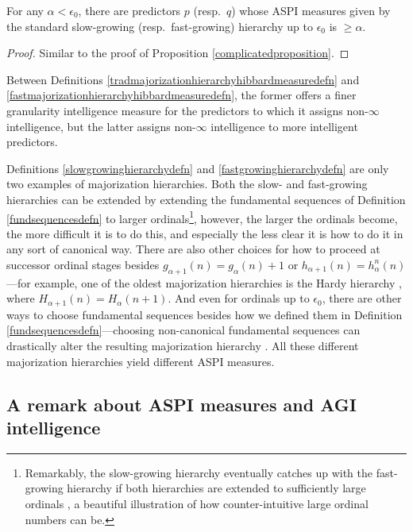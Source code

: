 \documentclass[twoside,11pt]{article}
\begin{document}
\begin{proposition}
    For any $\alpha<\epsilon_0$, there are predictors $p$ (resp.\ $q$)
    whose ASPI measures
    given by the standard slow-growing (resp.\ fast-growing)
    hierarchy up to $\epsilon_0$
    is $\geq \alpha$.
\end{proposition}

\begin{proof}
    Similar to the proof of Proposition \ref{complicatedproposition}.
\end{proof}

Between Definitions \ref{tradmajorizationhierarchyhibbardmeasuredefn} and
\ref{fastmajorizationhierarchyhibbardmeasuredefn}, the former offers a finer
granularity
intelligence measure for the predictors to which it assigns non-$\infty$
intelligence, but the latter assigns non-$\infty$ intelligence to
more intelligent predictors.

Definitions \ref{slowgrowinghierarchydefn}
and \ref{fastgrowinghierarchydefn} are only two
examples of
majorization hierarchies. Both the slow- and fast-growing hierarchies can be
extended by extending the fundamental sequences of Definition
\ref{fundsequencesdefn} to larger ordinals\footnote{Remarkably,
the slow-growing hierarchy eventually catches up with the fast-growing hierarchy
if both hierarchies are extended to sufficiently large ordinals
\citep{wainer1989slow, girard1981pi12}, a beautiful illustration of
how counter-intuitive
large ordinal numbers can be.}, however, the larger
the ordinals become, the more difficult it is to do this, and especially the less
clear it is how to do it in any sort of canonical way.
There are also other choices for how to proceed at successor ordinal stages besides
$g_{\alpha+1}(n)=g_\alpha(n)+1$ or $h_{\alpha+1}(n)=h^n_\alpha(n)$---for example,
one of the oldest majorization hierarchies is the Hardy hierarchy
\citep{hardy1904theorem}, where $H_{\alpha+1}(n)=H_\alpha(n+1)$.
And even for ordinals up to $\epsilon_0$,
there are other ways to choose fundamental sequences besides how we defined them in
Definition \ref{fundsequencesdefn}---choosing non-canonical fundamental sequences can
drastically alter the resulting majorization hierarchy \citep{weiermann1997sometimes}.
All these different majorization hierarchies yield different ASPI measures.

\subsection{A remark about ASPI measures and AGI intelligence}
\end{document}
